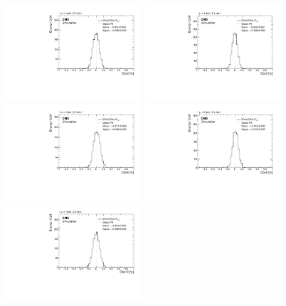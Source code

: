 \begin{figure}
    \centering
    \includegraphics[width=0.45\textwidth]{figure/SimAcp_18_el_Obs3_Acp_10_mixed.pdf}
    \includegraphics[width=0.45\textwidth]{figure/SimAcp_18_mu_Obs3_Acp_10_mixed.pdf}
    \includegraphics[width=0.45\textwidth]{figure/SimAcp_18_el_Obs6_Acp_10_mixed.pdf}
    \includegraphics[width=0.45\textwidth]{figure/SimAcp_18_mu_Obs6_Acp_10_mixed.pdf}
    \includegraphics[width=0.45\textwidth]{figure/SimAcp_18_el_Obs12_Acp_10_mixed.pdf}

\end{figure}
